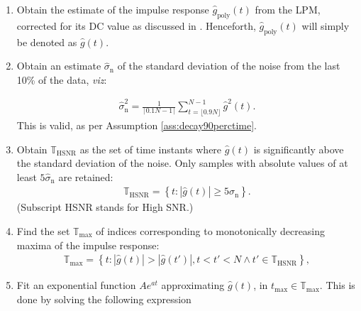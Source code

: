 \begin{enumerate}
\item Obtain the estimate of the impulse response $\hat g_\mathrm{poly}(t)$ from the \gls{LPM}, corrected for its \gls{DC} value as discussed in . Henceforth, $\hat g_\mathrm{poly}(t)$ will simply be denoted as $\hat g(t)$. %

\item Obtain an estimate $\hat \sigma_\mathrm{n}$ of the standard deviation of the noise from the last 10\% of the data, \emph{viz}:

\begin{align}
\hat \sigma^2_\mathrm{n}=\frac{1}{\lceil0.1N - 1\rceil}\sum_{t=\lfloor0.9N\rfloor}^{N-1}\hat g^2(t).
\end{align}
This is valid, as per Assumption \ref{ass:decay90perctime}.


\item Obtain $\mathbb{T}_\mathrm{HSNR}$ as the set of time instants where $\hat g(t)$ is significantly above the standard deviation of the noise. Only samples with absolute values of at least $5\hat\sigma_\mathrm{n}$ are retained: %
\begin{align}
\mathbb{T}_\mathrm{HSNR} = \left\{
t:|\hat g(t)|\geqslant 5\hat\sigma_\mathrm{n}
\right\}.
\end{align}
(Subscript HSNR stands for High \gls{SNR}.)


\item Find the set $\mathbb{T}_\mathrm{max}$ of indices corresponding to monotonically decreasing maxima of the impulse response:
\begin{align}\label{eq:TmaxDef}
\mathbb{T}_\mathrm{max} = \left\{
t: \left| \hat g(t)\right|>
\left|\hat g(t')\right|,
t < t' < N \land t'\in\mathbb{T}_\mathrm{HSNR}
\right\},
\end{align}

\item Fit an exponential function $Ae^{at}$ approximating $\hat g(t)$, in $t_\mathrm{max}\in\mathbb{T}_\mathrm{max}$. 
This is done by solving the following expression


\end{enumerate}
